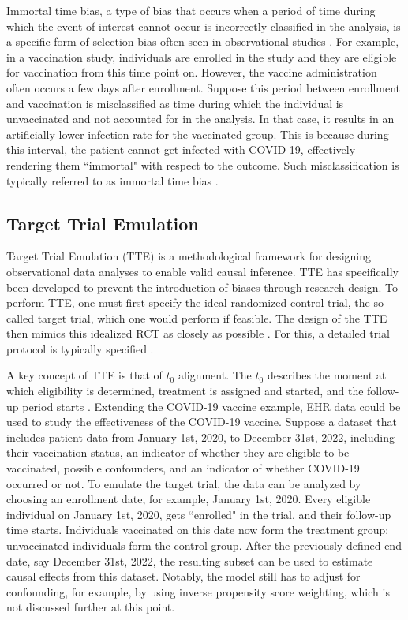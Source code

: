 \documentclass[pdflatex,sn-vancouver-ay]{sn-jnl}%
\theoremstyle{thmstyleone}%
\theoremstyle{thmstyletwo}%
\theoremstyle{thmstylethree}%
\begin{document}
Immortal time bias, a type of bias that occurs when a period of time during which the event of interest cannot occur is incorrectly classified in the analysis, is a specific form of selection bias often seen in observational studies \citep{yadavImmortalTimeBias2021, hernanStructuralDescriptionBiases2025}. For example, in a vaccination study, individuals are enrolled in the study and they are eligible for vaccination from this time point on. However, the vaccine administration often occurs a few days after enrollment. Suppose this period between enrollment and vaccination is misclassified as time during which the individual is unvaccinated and not accounted for in the analysis. In that case, it results in an artificially lower infection rate for the vaccinated group. This is because during this interval, the patient cannot get infected with COVID-19, effectively rendering them ``immortal" with respect to the outcome. Such misclassification is typically referred to as immortal time bias \citep{hernanStructuralDescriptionBiases2025}.


\subsection{Target Trial Emulation}
Target Trial Emulation (TTE) is a methodological framework for designing observational data analyses to enable valid causal inference. TTE has specifically been developed to prevent the introduction of biases through research design. To perform TTE, one must first specify the ideal randomized control trial, the so-called target trial, which one would perform if feasible. The design of the TTE then mimics this idealized RCT as closely as possible \citep{hernanObservationalStudiesAnalyzed2008, hernanTargetTrialFramework2025}. For this, a detailed trial protocol is typically specified \citep{hernanObservationalStudiesAnalyzed2008, hernanTargetTrialFramework2025}. 

A key concept of TTE is that of $t_0$ alignment. The $t_0$ describes the moment at which eligibility is determined, treatment is assigned and started, and the follow-up period starts \citep{hernanObservationalStudiesAnalyzed2008, hernanTargetTrialFramework2025}. Extending the COVID-19 vaccine example, EHR data could be used to study the effectiveness of the COVID-19 vaccine. Suppose a dataset that includes patient data from January 1st, 2020, to December 31st, 2022, including their vaccination status, an indicator of whether they are eligible to be vaccinated, possible confounders, and an indicator of whether COVID-19 occurred or not. To emulate the target trial, the data can be analyzed by choosing an enrollment date, for example, January 1st, 2020. Every eligible individual on January 1st, 2020, gets ``enrolled" in the trial, and their follow-up time starts. Individuals vaccinated on this date now form the treatment group; unvaccinated individuals form the control group. After the previously defined end date, say December 31st, 2022, the resulting subset can be used to estimate causal effects from this dataset. Notably, the model still has to adjust for confounding, for example, by using inverse propensity score weighting, which is not discussed further at this point.
\end{document}
